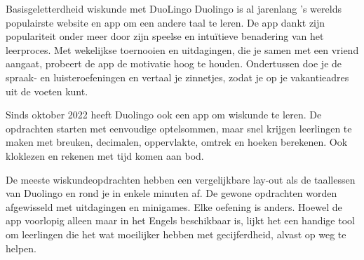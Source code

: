 \begin{lesactiviteit}{Basisgeletterdheid wiskunde met DuoLingo}
Duolingo is al jarenlang 's werelds populairste website en app om een andere taal te leren. De app dankt zijn populariteit onder meer door zijn speelse en intuïtieve benadering van het leerproces. Met wekelijkse toernooien en uitdagingen, die je samen met een vriend aangaat, probeert de app de motivatie hoog te houden. Ondertussen doe je de spraak- en luisteroefeningen en vertaal je zinnetjes, zodat je op je vakantieadres uit de voeten kunt. 

Sinds oktober 2022 heeft Duolingo ook een app om wiskunde te leren. De opdrachten starten met eenvoudige optelsommen, maar snel krijgen leerlingen te maken met breuken, decimalen, oppervlakte, omtrek en hoeken berekenen. Ook kloklezen en rekenen met tijd komen aan bod. 

De meeste wiskundeopdrachten hebben een vergelijkbare lay-out als de taallessen van Duolingo en rond je in enkele minuten af. De gewone opdrachten worden afgewisseld met uitdagingen en minigames. Elke oefening is anders. Hoewel de app voorlopig alleen maar in het Engels beschikbaar is, lijkt het een handige tool om leerlingen die het wat moeilijker hebben met gecijferdheid, alvast op weg te helpen. 
\end{lesactiviteit}

